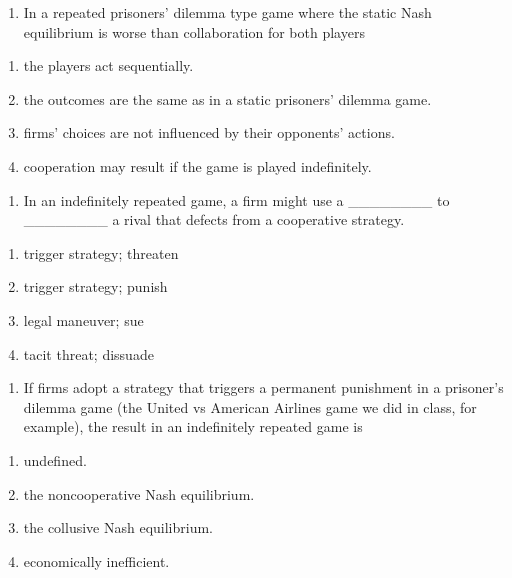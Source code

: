 \documentclass[11pt,]{article}
\providecommand{\tightlist}{%
  \setlength{\itemsep}{0pt}\setlength{\parskip}{0pt}}
\begin{document}
\begin{enumerate}
\def\labelenumi{\arabic{enumi})}
\setcounter{enumi}{2}
\tightlist
\item
  In a repeated prisoners' dilemma type game where the static Nash
  equilibrium is worse than collaboration for both players
\end{enumerate}

\begin{enumerate}
\def\labelenumi{\Alph{enumi})}
\tightlist
\item
  the players act sequentially.
\item
  the outcomes are the same as in a static prisoners' dilemma game.
\item
  firms' choices are not influenced by their opponents' actions.
\item
  cooperation may result if the game is played indefinitely.
\end{enumerate}

\begin{enumerate}
\def\labelenumi{\arabic{enumi})}
\setcounter{enumi}{3}
\tightlist
\item
  In an indefinitely repeated game, a firm might use a \_\_\_\_\_\_\_\_
  to \_\_\_\_\_\_\_\_ a rival that defects from a cooperative strategy.
\end{enumerate}

\begin{enumerate}
\def\labelenumi{\Alph{enumi})}
\tightlist
\item
  trigger strategy; threaten
\item
  trigger strategy; punish
\item
  legal maneuver; sue
\item
  tacit threat; dissuade
\end{enumerate}

\begin{enumerate}
\def\labelenumi{\arabic{enumi})}
\setcounter{enumi}{4}
\tightlist
\item
  If firms adopt a strategy that triggers a permanent punishment in a
  prisoner's dilemma game (the United vs American Airlines game we did
  in class, for example), the result in an indefinitely repeated game is
\end{enumerate}

\begin{enumerate}
\def\labelenumi{\Alph{enumi})}
\tightlist
\item
  undefined.
\item
  the noncooperative Nash equilibrium.
\item
  the collusive Nash equilibrium.
\item
  economically inefficient.
\end{enumerate}
\end{document}
